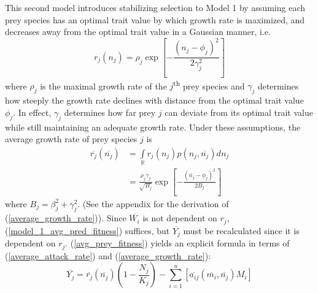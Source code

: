 \documentclass{amsart}
\theoremstyle{definition}
\theoremstyle{remark}
\numberwithin{equation}{section}
\begin{document}
This second model introduces stabilizing selection to Model 1 by assuming each prey species has an optimal trait value by which growth rate is maximized, and decreases away from the optimal trait value in a Gaussian manner, i.e.
\begin{equation}
	\label{growth_rate}
	r_j(n_j) = \rho_j\exp{\left[-\frac{(n_j - \phi_j)^2}{2\gamma_j^2}\right]}
\end{equation}
where $\rho_j$ is the maximal growth rate of the $j$\textsuperscript{th} prey species and $\gamma_j$ determines how steeply the growth rate declines with distance from the optimal trait value $\phi_j$.  In effect, $\gamma_j$ determines how far prey $j$ can deviate from its optimal trait value while still maintaining an adequate growth rate.  Under these assumptions, the average growth rate of prey species $j$ is
\begin{equation}
	\label{average_growth_rate}
	\begin{aligned}
		\overline{r_j}(\overline{n_j}) &= \int\limits_{\mathbb{R}}^{}r_j(n_j)p(n_j, \overline{n_j})dn_j \\
		&= \frac{\rho_j\gamma_j}{\sqrt{B_j}}\exp\left[-\frac{(\overline{n_j} - \phi_j)^2}{2B_j}\right]
	\end{aligned}
\end{equation}
where $B_j = \beta_j^2 + \gamma_j^2$.  (See the appendix for the derivation of (\ref{average_growth_rate})).  Since $\overline{W_i}$ is not dependent on $r_j$, (\ref{model_1_avg_pred_fitness}) suffices, but $\overline{Y_j}$ must be recalculated since it is dependent on $r_j$.  (\ref{avg_prey_fitness}) yields an explicit formula in terms of (\ref{average_attack_rate}) and (\ref{average_growth_rate}):
\begin{equation}
	\label{model_2_avg_prey_fitness}
	\overline{Y_j} = \overline{r_j}(\overline{n_j})\left(1 - \frac{N_j}{K_j}\right) - \sum\limits_{i = 1}^{u}\left[\overline{a_{ij}}(\overline{m_i}, \overline{n_j})M_i\right]
\end{equation}
\end{document}
